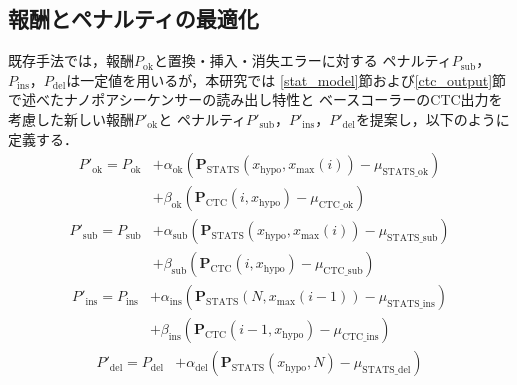 \documentclass[sotsuron]{kuee}
\begin{document}
\subsection{報酬とペナルティの最適化} \label{reward_penalty_optimization}
既存手法では，報酬$P_{\mathrm{ok}}$と置換・挿入・消失エラーに対する
ペナルティ$P_{\mathrm{sub}}$，$P_{\mathrm{ins}}$，$P_{\mathrm{del}}$は一定値を用いるが，本研究では
\ref{stat_model}節および\ref{ctc_output}節で述べたナノポアシーケンサーの読み出し特性と
ベースコーラーのCTC出力を考慮した新しい報酬$P'_{\mathrm{ok}}$と
ペナルティ$P'_{\mathrm{sub}}$，$P'_{\mathrm{ins}}$，$P'_{\mathrm{del}}$を提案し，以下のように定義する．
\begin{equation}
  \begin{split}
    P'_{\mathrm{ok}} = P_{\mathrm{ok}} &+ \alpha_{\mathrm{ok}}(\bm{P}_{\mathrm{STATS}}(x_{\mathrm{hypo}}, x_{\mathrm{max}}(i))-\mu_{\mathrm{STATS}\_\mathrm{ok}}) \label{opt1} \\ 
     &+ \beta_{\mathrm{ok}}(\bm{P}_{\mathrm{CTC}}(i, x_{\mathrm{hypo}})-\mu_{\mathrm{CTC}\_\mathrm{ok}}) 
  \end{split}
\end{equation}
\begin{equation}
  \begin{split}
    P'_{\mathrm{sub}} = P_{\mathrm{sub}} &+ \alpha_{\mathrm{sub}}(\bm{P}_{\mathrm{STATS}}(x_{\mathrm{hypo}}, x_{\mathrm{max}}(i))-\mu_{\mathrm{STATS}\_\mathrm{sub}}) \label{opt2} \\
    &+ \beta_{\mathrm{sub}}(\bm{P}_{\mathrm{CTC}}(i, x_{\mathrm{hypo}})-\mu_{\mathrm{CTC}\_\mathrm{sub}})
  \end{split}
\end{equation}
\begin{equation}
  \begin{split}
    P'_{\mathrm{ins}} = P_{\mathrm{ins}} &+ \alpha_{\mathrm{ins}}(\bm{P}_{\mathrm{STATS}}(N, x_{\mathrm{max}}(i-1))-\mu_{\mathrm{STATS}\_\mathrm{ins}}) \label{opt3}\\
    &+ \beta_{\mathrm{ins}}(\bm{P}_{\mathrm{CTC}}(i-1, x_{\mathrm{hypo}})-\mu_{\mathrm{CTC}\_\mathrm{ins}})
  \end{split}
\end{equation}
\begin{equation}
  \begin{split}
    P'_{\mathrm{del}} = P_{\mathrm{del}} &+ \alpha_{\mathrm{del}}(\bm{P}_{\mathrm{STATS}}(x_{\mathrm{hypo}}, N)-\mu_{\mathrm{STATS}\_\mathrm{del}}) \label{opt4}
  \end{split}
\end{equation}
\end{document}
